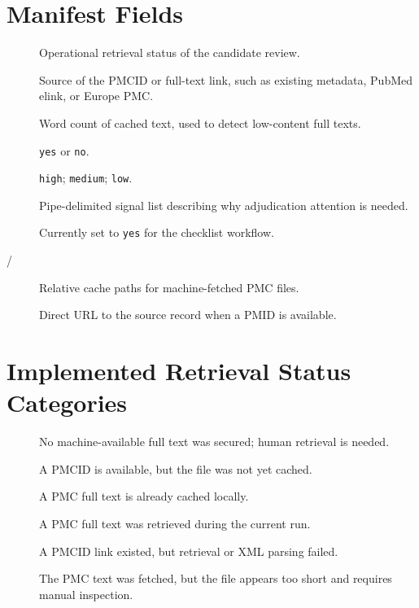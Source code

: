 \documentclass[11pt]{article}
\begin{document}
\section*{Manifest Fields}
\begin{description}
\item[] Operational retrieval status of the candidate review.
\item[] Source of the PMCID or full-text link, such as existing metadata, PubMed elink, or Europe PMC.
\item[] Word count of cached text, used to detect low-content full texts.
\item[] \texttt{yes} or \texttt{no}.
\item[] \texttt{high}; \texttt{medium}; \texttt{low}.
\item[] Pipe-delimited signal list describing why adjudication attention is needed.
\item[] Currently set to \texttt{yes} for the checklist workflow.
\item[ / ] Relative cache paths for machine-fetched PMC files.
\item[] Direct URL to the source record when a PMID is available.
\end{description}

\section*{Implemented Retrieval Status Categories}
\begin{description}
\item[] No machine-available full text was secured; human retrieval is needed.
\item[] A PMCID is available, but the file was not yet cached.
\item[] A PMC full text is already cached locally.
\item[] A PMC full text was retrieved during the current run.
\item[] A PMCID link existed, but retrieval or XML parsing failed.
\item[] The PMC text was fetched, but the file appears too short and requires manual inspection.
\end{description}
\end{document}
